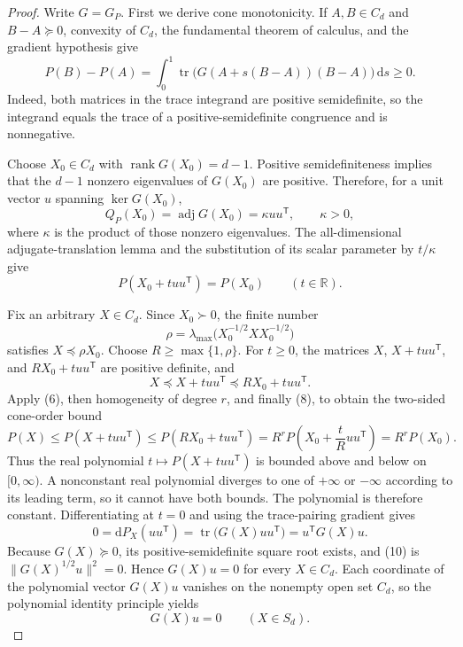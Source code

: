 \documentclass{article}
\begin{document}
\begin{proof}
Write \(G=G_P\).  First we derive cone monotonicity.  If \(A,B\in C_d\) and \(B-A\succeq0\), convexity of \(C_d\), the fundamental theorem of calculus, and the gradient hypothesis give
\[
 P(B)-P(A)
 =\int_0^1\operatorname{tr}\bigl(G(A+s(B-A))(B-A)\bigr)\,\mathrm ds
 \geq0. \tag{6}
\]
Indeed, both matrices in the trace integrand are positive semidefinite, so the integrand equals the trace of a positive-semidefinite congruence and is nonnegative.

Choose \(X_0\in C_d\) with \(\operatorname{rank}G(X_0)=d-1\).  Positive semidefiniteness implies that the \(d-1\) nonzero eigenvalues of \(G(X_0)\) are positive.  Therefore, for a unit vector \(u\) spanning \(\ker G(X_0)\),
\[
 Q_P(X_0)=\operatorname{adj}G(X_0)=\kappa uu^{\mathsf T},
 \qquad \kappa>0, \tag{7}
\]
where \(\kappa\) is the product of those nonzero eigenvalues.  The all-dimensional adjugate-translation lemma and the substitution of its scalar parameter by \(t/\kappa\) give
\[
 P(X_0+tuu^{\mathsf T})=P(X_0)
 \qquad(t\in\mathbb R). \tag{8}
\]

Fix an arbitrary \(X\in C_d\).  Since \(X_0\succ0\), the finite number
\[
 \rho=\lambda_{\max}\bigl(X_0^{-1/2}XX_0^{-1/2}\bigr)
\]
satisfies \(X\preceq\rho X_0\).  Choose \(R\geq\max\{1,\rho\}\).  For \(t\geq0\), the matrices \(X\), \(X+tuu^{\mathsf T}\), and \(RX_0+tuu^{\mathsf T}\) are positive definite, and
\[
 X\preceq X+tuu^{\mathsf T}\preceq RX_0+tuu^{\mathsf T}.
\]
Apply (6), then homogeneity of degree \(r\), and finally (8), to obtain the two-sided cone-order bound
\[
 P(X)
 \leq P(X+tuu^{\mathsf T})
 \leq P(RX_0+tuu^{\mathsf T})
 =R^rP\left(X_0+\frac{t}{R}uu^{\mathsf T}\right)
 =R^rP(X_0). \tag{9}
\]
Thus the real polynomial \(t\mapsto P(X+tuu^{\mathsf T})\) is bounded above and below on \([0,\infty)\).  A nonconstant real polynomial diverges to one of \(+\infty\) or \(-\infty\) according to its leading term, so it cannot have both bounds.  The polynomial is therefore constant.  Differentiating at \(t=0\) and using the trace-pairing gradient gives
\[
 0=\mathrm dP_X(uu^{\mathsf T})
 =\operatorname{tr}\bigl(G(X)uu^{\mathsf T}\bigr)
 =u^{\mathsf T}G(X)u. \tag{10}
\]
Because \(G(X)\succeq0\), its positive-semidefinite square root exists, and (10) is \(\lVert G(X)^{1/2}u\rVert^2=0\).  Hence \(G(X)u=0\) for every \(X\in C_d\).  Each coordinate of the polynomial vector \(G(X)u\) vanishes on the nonempty open set \(C_d\), so the polynomial identity principle yields
\[
 G(X)u=0\qquad(X\in S_d). \tag{11}
\]


\end{proof}
\end{document}

